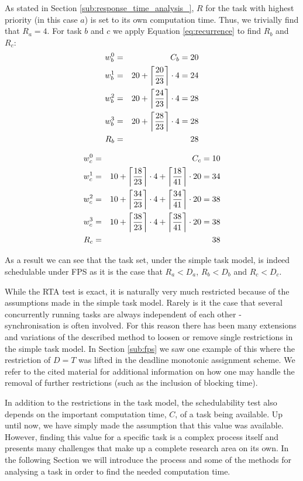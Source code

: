 As stated in Section \ref{sub:response_time_analysis_}, $R$ for the task with highest priority (in this case $a$) is set to its own computation time. Thus, we trivially find that $R_a = 4$. For task $b$ and $c$ we apply Equation \ref{eq:recurrence} to find $R_b$ and $R_c$:
\begin{eqnarray}
    w_{b}^0 &=& C_{b} = 20 \nonumber \\ 
    w_{b}^1 &=& 20 + \ceil[\bigg]{\frac{20}{23}} \cdot 4 = 24 \nonumber \\ 
    w_{b}^2 &=& 20 + \ceil[\bigg]{\frac{24}{23}} \cdot 4 = 28 \nonumber \\
    w_{b}^3 &=& 20 + \ceil[\bigg]{\frac{28}{23}} \cdot 4 = 28 \nonumber \\
    R_{b} &=& 28
\end{eqnarray}

\begin{eqnarray}
    w_{c}^0 &=& C_{c} = 10 \nonumber \\ 
    w_{c}^1 &=& 10 + \ceil[\bigg]{\frac{18}{23}} \cdot 4 + \ceil[\bigg]{\frac{18}{41}} \cdot 20 = 34 \nonumber \\ 
    w_{c}^2 &=& 10 + \ceil[\bigg]{\frac{34}{23}} \cdot 4 + \ceil[\bigg]{\frac{34}{41}} \cdot 20 = 38 \nonumber \\ 
    w_{c}^3 &=& 10 + \ceil[\bigg]{\frac{38}{23}} \cdot 4 + \ceil[\bigg]{\frac{38}{41}} \cdot 20 = 38 \nonumber \\ 
    R_{c} &=& 38
\end{eqnarray}

As a result we can see that the task set, under the simple task model, is indeed schedulable under FPS as it is the case that {$R_{a} < D_{a}$, $R_{b} < D_{b}$ and $R_{c} < D_{c}$}.

While the RTA test is exact, it is naturally very much restricted because of the assumptions made in the simple task model. Rarely is it the case that several concurrently running tasks are always independent of each other - synchronisation is often involved. For this reason there has been many extensions and variations of the described method to loosen or remove single restrictions in the simple task model. In Section \ref{sub:fps} we saw one example of this where the restriction of $D = T$ was lifted in the deadline monotonic assignment scheme. We refer to the cited material for additional information on how one may handle the removal of further restrictions (such as the inclusion of blocking time).

In addition to the restrictions in the task model, the schedulability test also depends on the important computation time, $C$, of a task being available. Up until now, we have simply made the assumption that this value was available. However, finding this value for a specific task is a complex process itself and presents many challenges that make up a complete research area on its own. In the following Section we will introduce the process and some of the methods for analysing a task in order to find the needed computation time.

